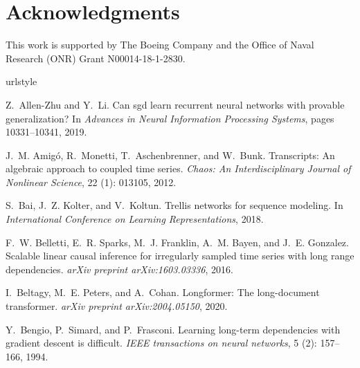 \documentclass{MITcsail}
\begin{document}
\section*{Acknowledgments}
This work is supported by The Boeing Company and the Office of Naval Research (ONR) Grant N00014-18-1-2830.




\begin{thebibliography}{96}
\providecommand{\natexlab}[1]{#1}
\providecommand{\url}[1]{\texttt{#1}}
\expandafter\ifx\csname urlstyle\endcsname\relax
  \providecommand{\doi}[1]{doi: #1}\else
  \providecommand{\doi}{doi: \begingroup \urlstyle{rm}\Url}\fi

Z.~Allen-Zhu and Y.~Li.
\newblock Can sgd learn recurrent neural networks with provable generalization?
\newblock In \emph{Advances in Neural Information Processing Systems}, pages
  10331--10341, 2019.

J.~M. Amig{\'o}, R.~Monetti, T.~Aschenbrenner, and W.~Bunk.
\newblock Transcripts: An algebraic approach to coupled time series.
\newblock \emph{Chaos: An Interdisciplinary Journal of Nonlinear Science},
  22 (1): 013105, 2012.

S.~Bai, J.~Z. Kolter, and V.~Koltun.
\newblock Trellis networks for sequence modeling.
\newblock In \emph{International Conference on Learning Representations}, 2018.

F.~W. Belletti, E.~R. Sparks, M.~J. Franklin, A.~M. Bayen, and J.~E. Gonzalez.
\newblock Scalable linear causal inference for irregularly sampled time series
  with long range dependencies.
\newblock \emph{arXiv preprint arXiv:1603.03336}, 2016.

I.~Beltagy, M.~E. Peters, and A.~Cohan.
\newblock Longformer: The long-document transformer.
\newblock \emph{arXiv preprint arXiv:2004.05150}, 2020.

Y.~Bengio, P.~Simard, and P.~Frasconi.
\newblock Learning long-term dependencies with gradient descent is difficult.
\newblock \emph{IEEE transactions on neural networks}, 5 (2):
  157--166, 1994.


\end{thebibliography}
\end{document}
